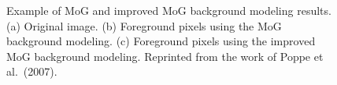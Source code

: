 \begin{figure}[t]
  \centering
  \hspace{0.1in}
  \hspace{0.1in}
  \caption[Example of MoG and improved MoG background modeling
  results.]{Example of MoG and improved MoG background modeling
  results. (a) Original image. (b) Foreground pixels using the MoG
  background modeling. (c) Foreground pixels using the improved MoG
  background modeling. Reprinted from the work of Poppe et al.\
  (2007).}
  \label{fig:poppe-bck-model-results}
\end{figure}

